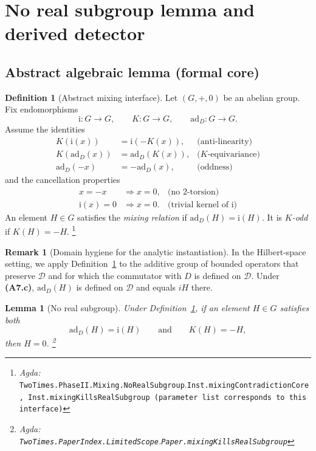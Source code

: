 \documentclass{article}
\newcommand{\Agda}[1]{\texttt{#1}}
\newcommand{\AgdaRef}[2]{\emph{Agda: }\Agda{#1}.\Agda{#2}}
\newcommand{\AgdaNote}[2]{\footnote{\AgdaRef{#1}{#2}}}
\theoremstyle{definition}
\newtheorem{definition}{Definition}[section]
\newtheorem{remark}{Remark}[section]
\theoremstyle{plain}
\newtheorem{lemma}{Lemma}[section]
\begin{document}
\section{No real subgroup lemma and derived detector}
\label{sec:mixing-detector}

\subsection{Abstract algebraic lemma (formal core)}\label{subsec:limited-scope-theorem-translation-001}

\begin{definition}[Abstract mixing interface]
\label{def:abstract-mixing}
Let $(G,+,0)$ be an abelian group. Fix endomorphisms
\[\mathrm{i}:G\to G,\qquad K:G\to G,\qquad \mathrm{ad}_D:G\to G.\]
Assume the identities
\begin{align}
  K(\mathrm{i}(x)) &= \mathrm{i}(-K(x)), &\text{(anti-linearity)}\\
  K(\mathrm{ad}_D(x)) &= \mathrm{ad}_D(K(x)), &\text{($K$-equivariance)}\\
  \mathrm{ad}_D(-x) &= -\mathrm{ad}_D(x), &\text{(oddness)}
\end{align}
and the cancellation properties
\begin{align}
  x=-x &\Rightarrow x=0, &\text{(no $2$-torsion)}\\
  \mathrm{i}(x)=0 &\Rightarrow x=0. &\text{(trivial kernel of $\mathrm{i}$)}
\end{align}
An element $H\in G$ satisfies the \emph{mixing relation} if $\mathrm{ad}_D(H)=\mathrm{i}(H)$.
It is \emph{$K$-odd} if $K(H)=-H$.
\AgdaNote{TwoTimes.PhaseII.Mixing.NoRealSubgroup}{Inst.mixingContradictionCore, Inst.mixingKillsRealSubgroup (parameter list corresponds to this interface)}
\end{definition}

\begin{remark}[Domain hygiene for the analytic instantiation]
In the Hilbert-space setting, we apply Definition~\ref{def:abstract-mixing} to the
additive group of bounded operators that preserve $\mathcal D$ and for which the
commutator with $D$ is defined on $\mathcal D$. Under \textbf{(A7.c)}, $\mathrm{ad}_D(H)$
is defined on $\mathcal D$ and equals $iH$ there.
\end{remark}

\begin{lemma}[No real subgroup]
\label{lem:no-real-subgroup}
Under Definition~\ref{def:abstract-mixing}, if an element $H\in G$ satisfies both
\[\mathrm{ad}_D(H)=\mathrm{i}(H)\qquad\text{and}\qquad K(H)=-H,\]
then $H=0$.
\AgdaNote{TwoTimes.PaperIndex.LimitedScope}{Paper.mixingKillsRealSubgroup}
\end{lemma}
\end{document}
